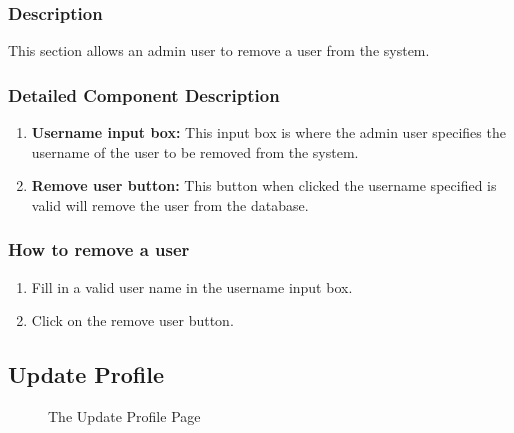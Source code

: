 \documentclass[14pt, a4paper]{article}
\begin{document}
	\subsubsection{Description} This section allows an admin user to remove a user from the system.
	\subsubsection{Detailed Component Description}
		\begin{enumerate}
			\item \textbf{Username input box:} This input box is where the admin user specifies the username of the user to be removed from the system.
			\item \textbf{Remove user button:} This button when clicked the username specified is valid will remove the user from the database.
		\end{enumerate}
	\subsubsection{How to remove a user}
		\begin{enumerate}
			\item Fill in a valid user name in the username input box.
			\item Click on the remove user button.
		\end{enumerate}
\subsection{Update Profile}
	\begin{figure}[H]
		\centerline{}
		\caption{The Update Profile Page}
  		\label{fig:navbar4}
	\end{figure}
\end{document}
